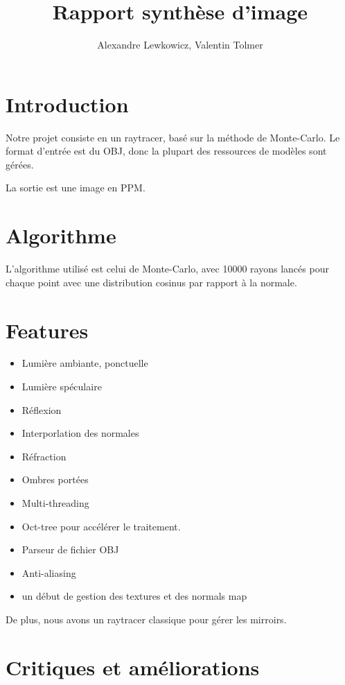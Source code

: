 \documentclass{article}
\title{Rapport synthèse d'image}
\author{Alexandre Lewkowicz, Valentin Tolmer}
\begin{document}
\maketitle

\section{Introduction}

Notre projet consiste en un raytracer, basé sur la méthode de Monte-Carlo. Le
format d'entrée est du OBJ, donc la plupart des ressources de modèles sont
gérées.

La sortie est une image en PPM.

\section{Algorithme}

L'algorithme utilisé est celui de Monte-Carlo, avec 10000 rayons lancés pour
chaque point avec une distribution cosinus par rapport à la normale.

\section{Features}

\begin{itemize}
  \item Lumière ambiante, ponctuelle
  \item Lumière spéculaire
  \item Réflexion
  \item Interporlation des normales
  \item Réfraction
  \item Ombres portées
  \item Multi-threading
  \item Oct-tree pour accélérer le traitement.
  \item Parseur de fichier OBJ
  \item Anti-aliasing
  \item un début de gestion des textures et des normals map
\end{itemize}

De plus, nous avons un raytracer classique pour gérer les mirroirs.

\section{Critiques et améliorations}
\end{document}
